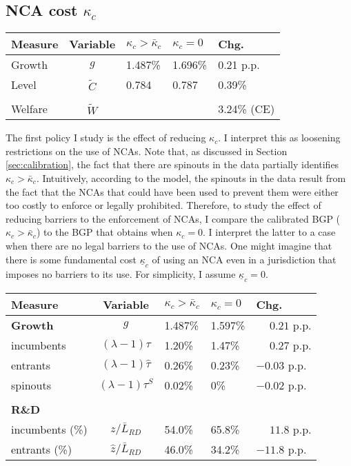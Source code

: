 \documentclass[11pt,english]{article}
\theoremstyle{definition}
\begin{document}
\subsection{NCA cost $\kappa_c$}

\begin{table}
	\centering
	\label{reducing_kappa_c_table}
	\begin{tabular}{lclll}
		\toprule \toprule
		Measure & Variable & $\kappa_c > \bar{\kappa}_c$ & $\kappa_c = 0$ & Chg. \tabularnewline
		\midrule
		Growth & $g$ & 1.487\% & 1.696\% & 0.21 p.p. \tabularnewline
		Level & $\tilde{C}$  & 0.784 &  0.787 & 0.39\% \tabularnewline 
		\tabularnewline
		Welfare & $\tilde{W}$  &  & & 3.24\% (CE)  \tabularnewline
		\bottomrule
	\end{tabular}
\end{table}

The first policy I study is the effect of reducing $\kappa_c$. I interpret this as loosening restrictions on the use of NCAs. Note that, as discussed in Section \ref{sec:calibration}, the fact that there are spinouts in the data partially identifies $\kappa_c > \bar{\kappa}_c$. Intuitively, according to the model, the spinouts in the data result from the fact that the NCAs that could have been used to prevent them were either too costly to enforce or legally prohibited. Therefore, to study the effect of reducing barriers to the enforcement of NCAs, I compare the calibrated BGP ($\kappa_c > \bar{\kappa}_c$) to the BGP that obtains when $\kappa_c = 0$. I interpret the latter to a case when there are no legal barriers to the use of NCAs. One might imagine that there is some fundamental cost $\underline{\kappa}_c$ of using an NCA even in a jurisdiction that imposes no barriers to its use. For simplicity, I assume $\underline{\kappa}_c = 0$. 

\begin{table}
	\centering
	\label{reducing_kappa_c_decomposition_table}
	\begin{tabular}{lclll}
		\toprule \toprule
		Measure & Variable & $\kappa_c > \bar{\kappa}_c$ & $\kappa_c = 0$ & Chg. \tabularnewline
		\midrule
		\textbf{Growth} & $g$ & 1.487\% & 1.597\% & $\phantom{-} 0.21$ p.p.\tabularnewline
		\multicolumn{1}{l}{\quad incumbents} & $(\lambda -1) \tau$  & 1.20\% & 1.47\% & $\phantom{-}0.27$ p.p. \tabularnewline
		\multicolumn{1}{l}{\quad entrants} & $(\lambda -1) \hat{\tau}$ & 0.26\% & 0.23\% & $-0.03$ p.p. \tabularnewline
		\multicolumn{1}{l}{\quad spinouts} & $(\lambda -1) \tau^S$ & 0.02\% & 0\% & $-0.02$ p.p. \tabularnewline
		\tabularnewline
		\textbf{R\&D} & & & & 
		\tabularnewline
		\multicolumn{1}{l}{\quad incumbents (\%)}  & $z / \bar{L}_{RD}$ & 54.0\% & 65.8\% & $\phantom{-} 11.8$ p.p. \tabularnewline 
		
		\multicolumn{1}{l}{\quad entrants (\%)}  & $\hat{z} / \bar{L}_{RD}$ & 46.0\% & 34.2\% & $-11.8$ p.p. \tabularnewline
		\bottomrule
	\end{tabular}
\end{table}
\end{document}
